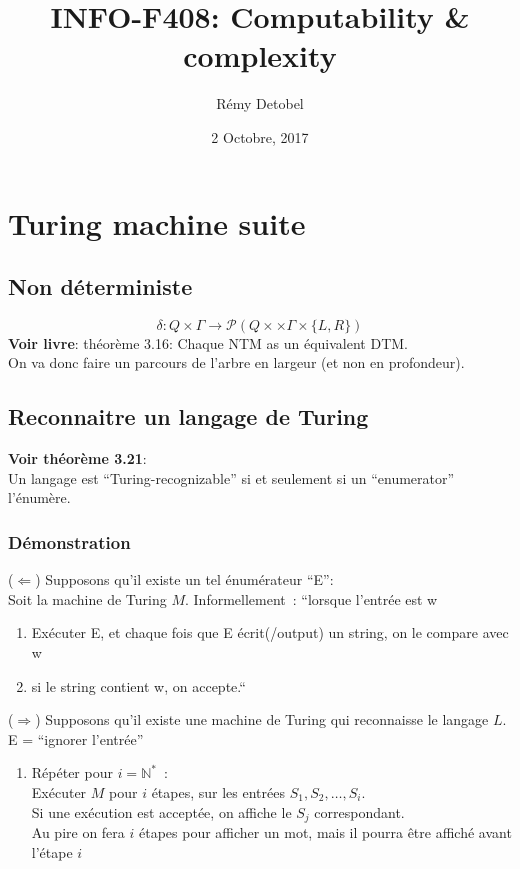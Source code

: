\documentclass[a4paper,12pt]{article}
\title{INFO-F408: Computability \& complexity}
\author{Rémy Detobel}
\date{2 Octobre, 2017}
\begin{document}
\maketitle
\newpage

\section{Turing machine suite}
  \subsection{Non déterministe}
    $$\delta: Q \times \Gamma \rightarrow \mathcal P ( Q \times \times \Gamma \times \{L, R\})$$
    \textbf{Voir livre}: théorème 3.16: Chaque NTM as un équivalent DTM.\\
    On va donc faire un parcours de l'arbre en largeur (et non en profondeur).

  \subsection{Reconnaitre un langage de Turing}
    \textbf{Voir théorème 3.21}:\\
    Un langage est ``Turing-recognizable'' si et seulement si un ``enumerator'' l'énumère.

    \subsubsection{Démonstration}
      ($\Leftarrow$) Supposons qu'il existe un tel énumérateur ``E'':\\
      Soit la machine de Turing $M$. Informellement~: ``lorsque l'entrée est w
      \begin{enumerate}
	\item Exécuter E, et chaque fois que E écrit(/output) un string, on le compare avec w
	\item si le string contient w, on accepte.``
      \end{enumerate}

      ($\Rightarrow$) Supposons qu'il existe une machine de Turing qui reconnaisse le langage $L$.\\
      E = ``ignorer l'entrée''
      \begin{enumerate}
	\item Répéter pour $i = \mathbb N^*$~:\\
	Exécuter $M$ pour $i$ étapes, sur les entrées $S_1, S_2, \ldots, S_i$.\\
	Si une exécution est acceptée, on affiche le $S_j$ correspondant.\\
	Au pire on fera $i$ étapes pour afficher un mot, mais il pourra être affiché avant l'étape $i$
      \end{enumerate}
\end{document}
